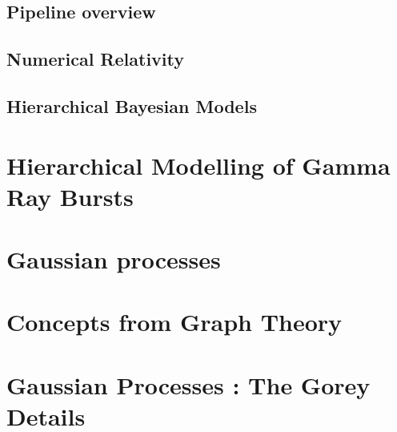 \documentclass{kentigern}
\theoremstyle{definition}
\begin{document}
\section{Pipeline overview}
\label{sec:pipeline-overview}

\section{Numerical Relativity}
\label{sec:numerical-relativity}


\section{Hierarchical Bayesian Models}
\label{sec:hierarchical-models}

\chapter{Hierarchical Modelling of Gamma Ray Bursts}
\label{cha:gamma-ray-burst}



\chapter{Gaussian processes}
\label{cha:gaussian-process}




\appendices

\chapter{Concepts from Graph Theory}
\label{chap:graph-theory}

\chapter{Gaussian Processes : The Gorey Details}
\label{chap:gp-details}






\glsaddall
\printglossaries
\end{document}
